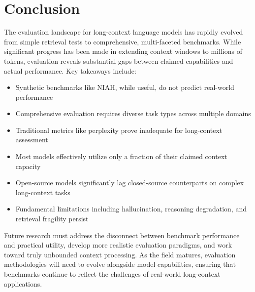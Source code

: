 \documentclass[11pt]{article}
\begin{document}
\section{Conclusion}

The evaluation landscape for long-context language models has rapidly evolved from simple retrieval tests to comprehensive, multi-faceted benchmarks. While significant progress has been made in extending context windows to millions of tokens, evaluation reveals substantial gaps between claimed capabilities and actual performance. Key takeaways include:

\begin{itemize}[leftmargin=*]
    \item Synthetic benchmarks like NIAH, while useful, do not predict real-world performance
    \item Comprehensive evaluation requires diverse task types across multiple domains
    \item Traditional metrics like perplexity prove inadequate for long-context assessment
    \item Most models effectively utilize only a fraction of their claimed context capacity
    \item Open-source models significantly lag closed-source counterparts on complex long-context tasks
    \item Fundamental limitations including hallucination, reasoning degradation, and retrieval fragility persist
\end{itemize}

Future research must address the disconnect between benchmark performance and practical utility, develop more realistic evaluation paradigms, and work toward truly unbounded context processing. As the field matures, evaluation methodologies will need to evolve alongside model capabilities, ensuring that benchmarks continue to reflect the challenges of real-world long-context applications.
\end{document}

